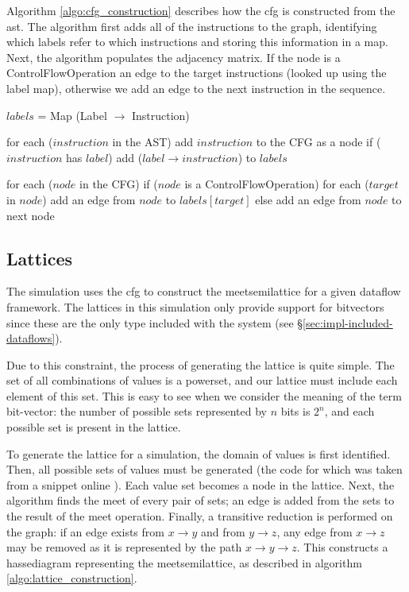 \documentclass[bsc,twoside,singlespacing,parskip,logo,notimes,normalheadings]{infthesis}
\begin{document}
        Algorithm \ref{algo:cfg_construction} describes how the
        \gls{cfg} is constructed from the \gls{ast}. The algorithm
        first adds all of the instructions to the graph, identifying
        which labels refer to which instructions and storing this
        information in a map. Next, the algorithm populates the
        adjacency matrix. If the node is a ControlFlowOperation an
        edge to the target instructions (looked up using the label
        map), otherwise we add an edge to the next instruction in the
        sequence.

        \begin{algorithm}[caption={Constructing a \gls{cfg} from an \gls{ast} for an \gls{iloc} program.}, label={algo:cfg_construction},mathescape=true]
$labels$ = Map (Label $\rightarrow$ Instruction)

for each ($instruction$ in the AST)
    add $instruction$ to the CFG as a node
    if ($instruction$ has $label$)
       add ($label \rightarrow instruction$) to $labels$

for each ($node$ in the CFG)
    if ($node$ is a ControlFlowOperation)
       for each ($target$ in $node$)
           add an edge from $node$ to $labels[target]$
    else
       add an edge from $node$ to next node
        \end{algorithm}

        \subsection{Lattices}\label{sec:impl_lattice}
        The simulation uses the \gls{cfg} to construct the
        \gls{meetsemilattice} for a given \gls{dataflow}
        framework. The lattices in this simulation only provide
        support for \gls{bitvector}s since these are the only type
        included with the system (see
        \S\ref{sec:impl-included-dataflows}).

        Due to this constraint, the process of generating the lattice
        is quite simple. The set of all combinations of values is a
        powerset, and our lattice must include each element of this
        set. This is easy to see when we consider the meaning of the
        term bit-vector: the number of possible sets represented by
        $n$ bits is $2^n$, and each possible set is present in the
        lattice.

        To generate the lattice for a simulation, the domain of values
        is first identified. Then, all possible sets of values must be
        generated (the code for which was taken from a snippet online
        \cite{snippet:combinations}). Each value set becomes a node in
        the lattice. Next, the algorithm finds the meet of every pair
        of sets; an edge is added from the sets to the result of the
        meet operation. Finally, a transitive reduction is performed
        on the graph: if an edge exists from $x \rightarrow y$ and
        from $y \rightarrow z$, any edge from $x \rightarrow z$ may be
        removed as it is represented by the path
        $x \rightarrow y \rightarrow z$. This constructs a
        \gls{hassediagram} representing the \gls{meetsemilattice}, as
        described in algorithm \ref{algo:lattice_construction}.
\end{document}
